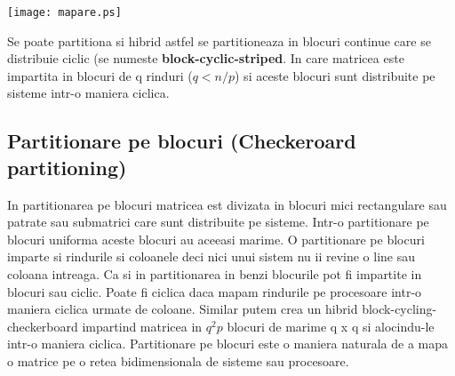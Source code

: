 \vspace{5mm}
\texttt{[image: mapare.ps]}
\vspace{5mm}

Se poate partitiona si hibrid astfel se partitioneaza in blocuri continue
care se distribuie ciclic (se numeste {\bf block-cyclic-striped}. In care
matricea este impartita in blocuri de q rinduri ($q<n/p$) si aceste blocuri
sunt distribuite pe  sisteme  intr-o maniera ciclica.
\subsection{Partitionare pe blocuri ({\bf Checkeroard partitioning})}

\hspace{5mm}In partitionarea pe blocuri matricea est divizata in blocuri
mici rectangulare sau patrate sau submatrici care sunt distribuite pe
sisteme. Intr-o partitionare pe blocuri uniforma aceste blocuri au aceeasi
marime. O partitionare pe blocuri imparte si rindurile si coloanele deci
nici unui sistem nu ii revine o line sau coloana intreaga. Ca si in
partitionarea in benzi blocurile pot fi impartite in blocuri sau ciclic.
Poate fi ciclica daca mapam rindurile pe procesoare intr-o maniera ciclica
urmate de coloane. Similar putem crea un hibrid  block-cycling-checkerboard
impartind matricea in $q^2p$ blocuri de marime q x q si alocindu-le intr-o
maniera ciclica. Partitionare pe blocuri este o maniera naturala de a mapa o
matrice pe o retea bidimensionala de sisteme sau procesoare.